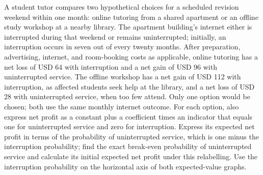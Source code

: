 A student tutor compares two hypothetical choices for a scheduled revision weekend within
one month: online tutoring from a shared apartment or an offline study workshop at a
nearby library. The apartment building's internet either is interrupted during that
weekend or remains uninterrupted; initially, an interruption occurs in seven out of every
twenty months. After preparation, advertising, internet, and room-booking costs as
applicable, online tutoring has a net loss of USD 64 with interruption and a net gain of
USD 96 with uninterrupted service. The offline workshop has a net gain of USD 112 with
interruption, as affected students seek help at the library, and a net loss of USD 28
with uninterrupted service, when too few attend. Only one option would be chosen; both
use the same monthly internet outcome. For each option, also express net profit as a
constant plus a coefficient times an indicator that equals one for uninterrupted service
and zero for interruption. Express its expected net profit in terms of the probability of
uninterrupted service, which is one minus the interruption probability; find the exact
break-even probability of uninterrupted service and calculate its initial expected net profit
under this relabelling. Use the interruption probability on the horizontal axis of both
expected-value graphs.


